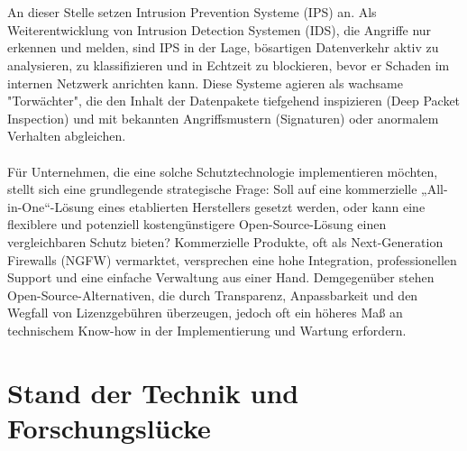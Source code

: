 \\\\
An dieser Stelle setzen Intrusion Prevention Systeme (IPS) an. Als Weiterentwicklung von Intrusion Detection Systemen (IDS), die Angriffe nur erkennen und melden, sind IPS in der Lage, bösartigen Datenverkehr aktiv zu analysieren, zu klassifizieren und in Echtzeit zu blockieren, bevor er Schaden im internen Netzwerk anrichten kann. Diese Systeme agieren als wachsame "Torwächter", die den Inhalt der Datenpakete tiefgehend inspizieren (Deep Packet Inspection) und mit bekannten Angriffsmustern (Signaturen) oder anormalem Verhalten abgleichen.
\\\\
Für Unternehmen, die eine solche Schutztechnologie implementieren möchten, stellt sich eine grundlegende strategische Frage: Soll auf eine kommerzielle „All-in-One“-Lösung eines etablierten Herstellers gesetzt werden, oder kann eine flexiblere und potenziell kostengünstigere Open-Source-Lösung einen vergleichbaren Schutz bieten? Kommerzielle Produkte, oft als Next-Generation Firewalls (NGFW) vermarktet, versprechen eine hohe Integration, professionellen Support und eine einfache Verwaltung aus einer Hand. Demgegenüber stehen Open-Source-Alternativen, die durch Transparenz, Anpassbarkeit und den Wegfall von Lizenzgebühren überzeugen, jedoch oft ein höheres Maß an technischem Know-how in der Implementierung und Wartung erfordern.
\section{Stand der Technik und Forschungslücke}

